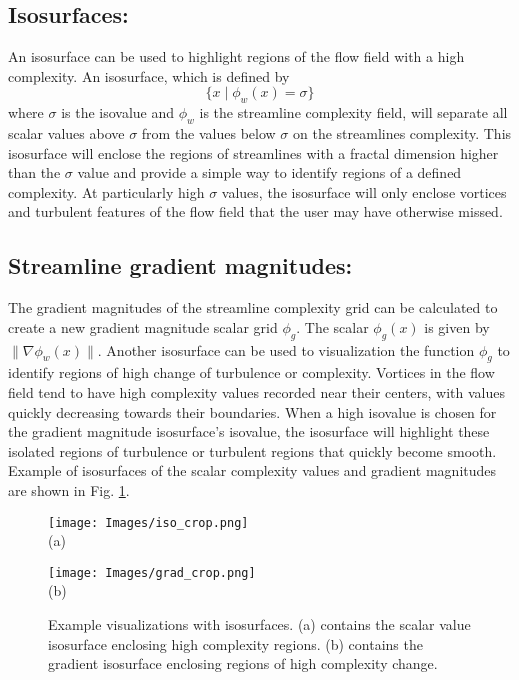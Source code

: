 \documentclass{egpubl}
\begin{document}
\subsection{Isosurfaces:} 
An isosurface can be used to highlight regions of the flow field with a high complexity.
An isosurface, which is defined by
\begin{equation} \{ x \mid \phi_w(x) = \sigma \}\end{equation}
where $\sigma$ is the isovalue and $\phi_w$ is the streamline complexity field, will separate all scalar values above $\sigma$ from the values below $\sigma$ on the streamlines complexity.
This isosurface will enclose the regions of streamlines with a fractal dimension higher than the $\sigma$ value and provide a simple way to identify regions of a defined complexity.
At particularly high $\sigma$ values, the isosurface will only enclose vortices and turbulent features of the flow field that the user may have otherwise missed.

\subsection{Streamline gradient magnitudes:}
The gradient magnitudes of the streamline complexity grid can be calculated to create a new gradient magnitude scalar grid $\phi_g$.
The scalar $\phi_g(x)$ is given by $\| \nabla \phi_w(x) \|$.
Another isosurface can be used to visualization the function $\phi_g$ to identify regions of high change of turbulence or complexity.
Vortices in the flow field tend to have high complexity values recorded near their centers, with values quickly decreasing towards their boundaries.
When a high isovalue is chosen for the gradient magnitude isosurface's isovalue, the isosurface will highlight these isolated regions of turbulence or turbulent regions that quickly become smooth.
Example of isosurfaces of the scalar complexity values and gradient magnitudes are shown in Fig. \ref{fig:iso}.

\begin{figure}[h]
        \centering
                \begin{minipage}{0.47\linewidth}
                        \small \centering
                        \texttt{[image: Images/iso\_crop.png]}\\(a)
                \end{minipage}
                \begin{minipage}{0.47\linewidth}
                        \small \centering
                        \texttt{[image: Images/grad\_crop.png]}\\(b)
                \end{minipage}
        \caption{Example visualizations with isosurfaces. (a) contains the scalar value isosurface enclosing high complexity regions. (b) contains the gradient isosurface enclosing regions of high complexity change.}
        \label{fig:iso}
\end{figure}
\end{document}
